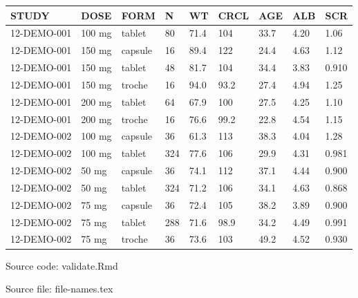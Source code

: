 \documentclass[
]{article}
\newenvironment{Shaded}{\begin{snugshade}}{\end{snugshade}}
\newcommand{\ControlFlowTok}[1]{\textcolor[rgb]{0.13,0.29,0.53}{\textbf{#1}}}
\newcommand{\DataTypeTok}[1]{\textcolor[rgb]{0.13,0.29,0.53}{#1}}
\newcommand{\KeywordTok}[1]{\textcolor[rgb]{0.13,0.29,0.53}{\textbf{#1}}}
\newcommand{\NormalTok}[1]{#1}
\newcommand{\OperatorTok}[1]{\textcolor[rgb]{0.81,0.36,0.00}{\textbf{#1}}}
\newcommand{\StringTok}[1]{\textcolor[rgb]{0.31,0.60,0.02}{#1}}
\begin{document}
\begin{table}[h]
\centering
{\def\arraystretch{1.4}\tabcolsep=5pt
\begin{threeparttable}
\begin{tabular}[h]{lllllllll}
\hline
STUDY & DOSE & FORM & N & WT & CRCL & AGE & ALB & SCR \\
\hline
12-DEMO-001 & 100 mg & tablet & 80 & 71.4 & 104 & 33.7 & 4.20 & 1.06 \\
12-DEMO-001 & 150 mg & capsule & 16 & 89.4 & 122 & 24.4 & 4.63 & 1.12 \\
12-DEMO-001 & 150 mg & tablet & 48 & 81.7 & 104 & 34.4 & 3.83 & 0.910 \\
12-DEMO-001 & 150 mg & troche & 16 & 94.0 & 93.2 & 27.4 & 4.94 & 1.25 \\
12-DEMO-001 & 200 mg & tablet & 64 & 67.9 & 100 & 27.5 & 4.25 & 1.10 \\
12-DEMO-001 & 200 mg & troche & 16 & 76.6 & 99.2 & 22.8 & 4.54 & 1.15 \\
12-DEMO-002 & 100 mg & capsule & 36 & 61.3 & 113 & 38.3 & 4.04 & 1.28 \\
12-DEMO-002 & 100 mg & tablet & 324 & 77.6 & 106 & 29.9 & 4.31 & 0.981 \\
12-DEMO-002 & 50 mg & capsule & 36 & 74.1 & 112 & 37.1 & 4.44 & 0.900 \\
12-DEMO-002 & 50 mg & tablet & 324 & 71.2 & 106 & 34.1 & 4.63 & 0.868 \\
12-DEMO-002 & 75 mg & capsule & 36 & 72.4 & 105 & 38.2 & 3.89 & 0.900 \\
12-DEMO-002 & 75 mg & tablet & 288 & 71.6 & 98.9 & 34.2 & 4.49 & 0.991 \\
12-DEMO-002 & 75 mg & troche & 36 & 73.6 & 103 & 49.2 & 4.52 & 0.930 \\
\hline
\end{tabular}
\begin{tablenotes}[flushleft]
\item Source code: validate.Rmd
\item Source file: file-names.tex
\end{tablenotes}
\end{threeparttable}
}
\end{table}

\begin{Shaded}
\end{Shaded}
\end{document}
